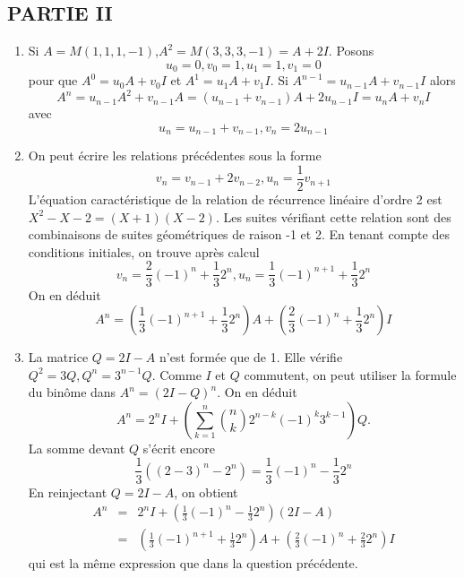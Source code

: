 \subsection*{PARTIE II}
\begin{enumerate}
\item Si $A=M(1,1,1,-1)$,$A^{2}=M(3,3,3,-1)=A+2I$. Posons $$u_{0}=0,v_{0}=1,u_{1}=1,v_{1}=0$$ pour que $A^{0}=u_{0}A+v_{0}I$ et $A^{1}=u_{1}A+v_{1}I$. Si $A^{n-1}=u_{n-1}A+v_{n-1}I$ alors
\[
A^{n}=u_{n-1}A^{2}+v_{n-1}A=(u_{n-1}+v_{n-1})A+2u_{n-1}I=u_{n}A+v_{n}I
\]
avec \[
u_{n}=u_{n-1}+v_{n-1},v_{n}=2u_{n-1}\]
\item On peut écrire les relations précédentes sous la forme
\[
v_{n}=v_{n-1}+2v_{n-2},u_{n}=\frac{1}{2}v_{n+1}\]
L'équation caractéristique de la relation de récurrence linéaire d'ordre 2 est $X^{2}-X-2=(X+1)(X-2)$. Les suites vérifiant cette relation sont des combinaisons de suites géométriques de raison -1 et 2. En tenant compte des conditions initiales, on trouve après calcul 
\[
v_{n}=\frac{2}{3}(-1)^{n}+\frac{1}{3}2^{n},
u_{n}=\frac{1}{3}(-1)^{n+1}+\frac{1}{3}2^{n}\]
On en déduit
\[
A^{n}=(\frac{1}{3}(-1)^{n+1}+\frac{1}{3}2^{n})A+(\frac{2}{3}(-1)^{n}+\frac{1}{3}2^{n})I
\]
\item La matrice $Q=2I-A$ n'est formée que de 1. Elle vérifie $Q^{2}=3Q,Q^{n}=3^{n-1}Q$. Comme $I$ et $Q$ commutent, on peut utiliser la formule du binôme dans $A^{n}=(2I-Q)^{n}$. On en déduit
\[
A^{n}=2^{n}I+(\sum _{k=1}^{n}\binom{n}{k}2^{n-k}(-1)^{k}3^{k-1})Q.
\]
La somme devant $Q$ s'écrit encore
\[\frac{1}{3}((2-3)^{n}-2^{n})=\frac{1}{3}(-1)^{n}-\frac{1}{3}2^{n}\]
En reinjectant $Q=2I-A$, on obtient
\begin{eqnarray*}
A^{n}&=&2^{n}I+(\frac{1}{3}(-1)^{n}-\frac{1}{3}2^{n})(2I-A)\\
&=& (\frac{1}{3}(-1)^{n+1}+\frac{1}{3}2^{n})A+(\frac{2}{3}(-1)^{n}+\frac{2}{3}2^{n})I
\end{eqnarray*}
qui est la même expression que dans la question précédente.
\end{enumerate}

